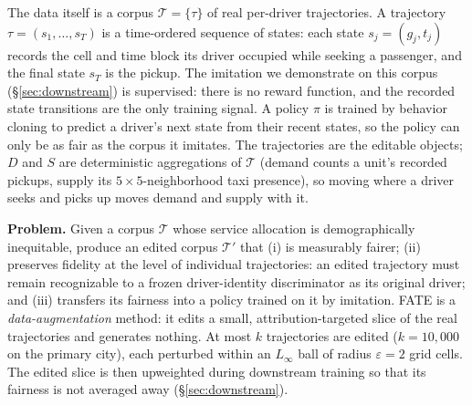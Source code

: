 The data itself is a corpus $\mathcal{T} = \{\tau\}$ of real per-driver
trajectories. A trajectory $\tau = (s_1, \dots, s_T)$ is a time-ordered
sequence of states: each state $s_j = (g_j, t_j)$ records the cell and time
block its driver occupied while seeking a passenger, and the final state
$s_T$ is the pickup. The imitation we demonstrate on this corpus
(\S\ref{sec:downstream}) is supervised: there is no reward function, and
the recorded state transitions are the only training signal.
A policy $\pi$ is trained by behavior cloning to predict a driver's next
state from their recent states, so the policy can
only be as fair as the corpus it imitates. The trajectories are the editable
objects; $D$ and $S$ are deterministic aggregations of $\mathcal{T}$ (demand
counts a unit's recorded pickups, supply its $5{\times}5$-neighborhood taxi
presence), so moving where a driver seeks and picks up moves demand and
supply with it.

\textbf{Problem.} Given a corpus $\mathcal{T}$ whose service allocation is
demographically inequitable, produce an edited corpus $\mathcal{T}'$ that
(i) is measurably fairer; (ii) preserves fidelity at the level of individual
trajectories: an edited trajectory must remain recognizable
to a frozen driver-identity discriminator as its original driver; and
(iii) transfers its fairness into a policy trained on it by imitation. FATE
is a \emph{data-augmentation} method: it edits a small, attribution-targeted
slice of the real trajectories and generates nothing. At most $k$
trajectories are edited ($k = 10{,}000$ on the primary city), each perturbed
within an $L_\infty$ ball of radius $\varepsilon = 2$ grid cells.
The edited slice is then upweighted during downstream training so that its
fairness is not averaged away (\S\ref{sec:downstream}).

